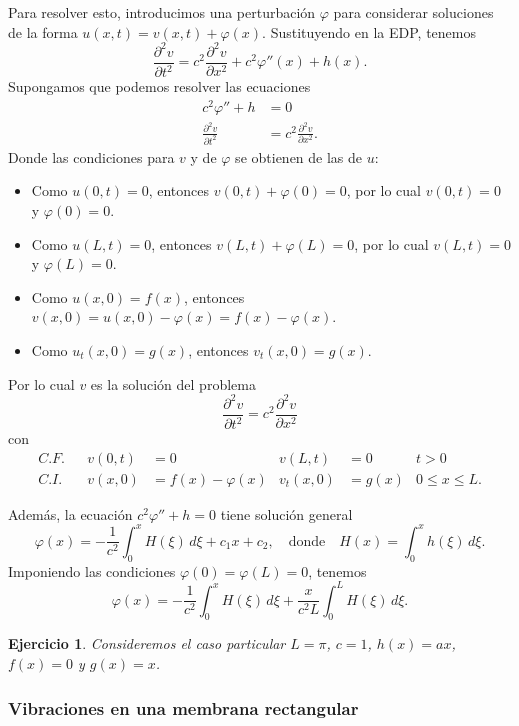 \documentclass[11pt,letterpaper,draft]{report}
\newtheorem{exe}[defn]{Ejercicio}
\newcommand\<{\langle}
\renewcommand\>{\rangle}
\renewcommand\phi\varphi
\begin{document}
Para resolver esto, introducimos una perturbación $\phi$ para
considerar soluciones de la forma $u(x,t)=v(x,t)+\phi(x)$.
Sustituyendo en la EDP, tenemos
\[
  \frac{\partial ^2v}{\partial t^2}
  = c^2 \frac{\partial ^2v}{\partial x^2} + c^2\phi''(x)+ h(x)
.\]
Supongamos que podemos resolver las ecuaciones
\begin{align*}
  c^2\phi''+h &= 0 \\
  \frac{\partial ^2v}{\partial t^2}
  &= c^2 \frac{\partial ^2v}{\partial x^2}.
\end{align*}
Donde las condiciones para $v$ y de $\phi$ se obtienen de las de $u$:
\begin{itemize}
  \item Como $u(0,t) = 0$, entonces $v(0,t)+\phi(0)=0$, por lo cual
    $v(0,t)=0$ y $\phi(0)=0$.
  \item Como $u(L,t)=0$, entonces $v(L,t)+\phi(L)=0$, por lo cual
    $v(L,t)=0$ y $\phi(L)=0$.
  \item Como $u(x,0)=f(x)$, entonces
    $v(x,0)=u(x,0)-\phi(x)=f(x)-\phi(x)$.
  \item Como $u_t(x,0)=g(x)$, entonces $v_t(x,0)=g(x)$.
\end{itemize}
Por lo cual $v$ es la solución del problema
\[
  \frac{\partial ^2v}{\partial t^2}
  = c^2 \frac{\partial ^2v}{\partial x^2}
\]
con
\begin{align*}
  C.F.&& v(0,t)&=0 & v(L,t)&=0 & t>0 \\
  C.I.&& v(x,0)&=f(x)-\phi(x) & v_t(x,0)&=g(x) & 0\leq x\leq L.
\end{align*}

Además, la ecuación $c^2\phi''+h=0$ tiene solución general
\[
  \phi(x) = -\frac{1}{c^2}\int_{0}^{x}H(\xi)\,d\xi+c_1x+c_2,
  \quad \text{donde} \quad H(x) = \int_{0}^{x}h(\xi)\,d\xi
.\]
Imponiendo las condiciones $\phi(0)=\phi(L)=0$, tenemos
\[
  \phi(x)=-\frac{1}{c^{2}}\int_{0}^{x}H(\xi)\,d\xi
  + \frac{x}{c^2L}\int_{0}^{L}H(\xi)\,d\xi
.\]

\begin{exe}
  Consideremos el caso particular $L=\pi$, $c=1$, $h(x)=ax$, $f(x)=0$
  y $g(x)=x$.
\end{exe}

\subsubsection{Vibraciones en una membrana rectangular}

\end{document}
